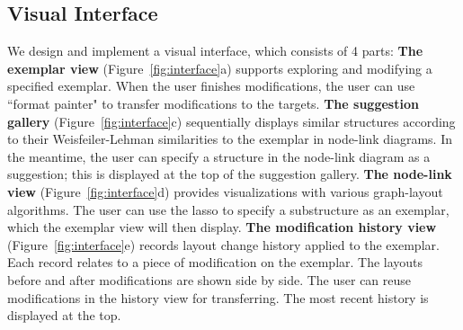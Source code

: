 \subsection{Visual Interface}
We design and implement a visual interface, which consists of 4 parts:
\textbf{The exemplar view}
(Figure~\ref{fig:interface}a) supports exploring and modifying a specified exemplar.
When the user finishes modifications,
the user can use ``format painter" to transfer modifications to the targets.
\textbf{The suggestion gallery}
(Figure~\ref{fig:interface}c) sequentially displays similar structures according to their Weisfeiler-Lehman similarities to the exemplar in node-link diagrams. 
In the meantime, the user can specify a structure in the node-link diagram as a suggestion; this is displayed at the top of the suggestion gallery. 
\textbf{The node-link view}
(Figure~\ref{fig:interface}d) provides visualizations with various graph-layout algorithms. The user can use the lasso to specify a substructure as an exemplar, which the exemplar view will then display.
\textbf{The modification history view}
(Figure~\ref{fig:interface}e) records layout change history applied to the exemplar. Each record relates to a piece of modification on the exemplar. The layouts before and after modifications are shown side by side. The user can reuse modifications in the history view for transferring. The most recent history is displayed at the top.